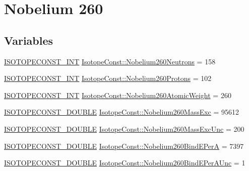 \hypertarget{group___isotope_const-_nobelium-_no260}{}\section{Nobelium 260}
\label{group___isotope_const-_nobelium-_no260}
\subsection*{Variables}
\begin{DoxyCompactItemize}
\item 
\mbox{\hyperlink{group___isotope_const-_macros_ga5f18360b3e99483a35c32d789e62621c}{I\+S\+O\+T\+O\+P\+E\+C\+O\+N\+S\+T\+\_\+\+I\+NT}} \mbox{\hyperlink{group___isotope_const-_nobelium-_no260_ga023c21bdfa313b74de1661be182632a6}{Isotope\+Const\+::\+Nobelium260\+Neutrons}} = 158
\item 
\mbox{\hyperlink{group___isotope_const-_macros_ga5f18360b3e99483a35c32d789e62621c}{I\+S\+O\+T\+O\+P\+E\+C\+O\+N\+S\+T\+\_\+\+I\+NT}} \mbox{\hyperlink{group___isotope_const-_nobelium-_no260_ga7cef088dcc440a0517e9c445f2f78b1f}{Isotope\+Const\+::\+Nobelium260\+Protons}} = 102
\item 
\mbox{\hyperlink{group___isotope_const-_macros_ga5f18360b3e99483a35c32d789e62621c}{I\+S\+O\+T\+O\+P\+E\+C\+O\+N\+S\+T\+\_\+\+I\+NT}} \mbox{\hyperlink{group___isotope_const-_nobelium-_no260_ga0998ab8c19dc9a0d0b51b9efe65b421f}{Isotope\+Const\+::\+Nobelium260\+Atomic\+Weight}} = 260
\item 
\mbox{\hyperlink{group___isotope_const-_macros_ga8f45a7272ce02c0b4c65c44636ed719a}{I\+S\+O\+T\+O\+P\+E\+C\+O\+N\+S\+T\+\_\+\+D\+O\+U\+B\+LE}} \mbox{\hyperlink{group___isotope_const-_nobelium-_no260_ga30ab1a59da1000345b42524cdafa7de4}{Isotope\+Const\+::\+Nobelium260\+Mass\+Exc}} = 95612
\item 
\mbox{\hyperlink{group___isotope_const-_macros_ga8f45a7272ce02c0b4c65c44636ed719a}{I\+S\+O\+T\+O\+P\+E\+C\+O\+N\+S\+T\+\_\+\+D\+O\+U\+B\+LE}} \mbox{\hyperlink{group___isotope_const-_nobelium-_no260_gadd24373d9aa454b304709ff9e3929bc7}{Isotope\+Const\+::\+Nobelium260\+Mass\+Exc\+Unc}} = 200
\item 
\mbox{\hyperlink{group___isotope_const-_macros_ga8f45a7272ce02c0b4c65c44636ed719a}{I\+S\+O\+T\+O\+P\+E\+C\+O\+N\+S\+T\+\_\+\+D\+O\+U\+B\+LE}} \mbox{\hyperlink{group___isotope_const-_nobelium-_no260_ga9fcd83c53ddaee8a6462dde69da9abb8}{Isotope\+Const\+::\+Nobelium260\+Bind\+E\+PerA}} = 7397
\item 
\mbox{\hyperlink{group___isotope_const-_macros_ga8f45a7272ce02c0b4c65c44636ed719a}{I\+S\+O\+T\+O\+P\+E\+C\+O\+N\+S\+T\+\_\+\+D\+O\+U\+B\+LE}} \mbox{\hyperlink{group___isotope_const-_nobelium-_no260_gaab92a8c9f9305ef87534bbba0165ab53}{Isotope\+Const\+::\+Nobelium260\+Bind\+E\+Per\+A\+Unc}} = 1

\end{DoxyCompactItemize}
